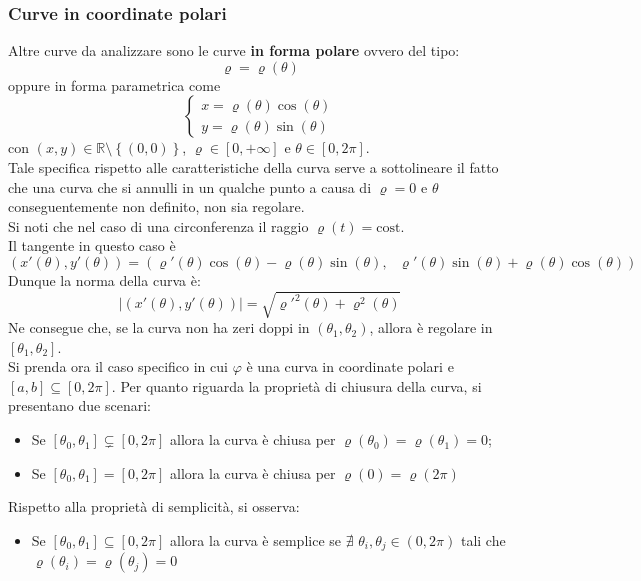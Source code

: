 \subsubsection{Curve in coordinate polari}
    Altre curve da analizzare sono le curve \textbf{in forma polare} ovvero del tipo:
    \begin{equation*}
        \varrho=\varrho(\theta) 
    \end{equation*}
    oppure in forma parametrica come 
    \begin{equation*}
        \begin{cases}
            x=\varrho(\theta)\cos(\theta)\\
            y=\varrho(\theta)\sin(\theta)
        \end{cases}
    \end{equation*}
    con $(x,y) \in \mathbb{R}\setminus \left\{(0,0)\right\}$, $\varrho \in \left[0, +\infty\right]$ e $\theta \in \left[0, 2\pi\right]$.\\
    Tale specifica rispetto alle caratteristiche della curva serve a sottolineare il fatto che una curva che si annulli in un qualche punto a causa di $\varrho=0$ e $\theta$ conseguentemente non definito, non sia regolare.\\
    Si noti che nel caso di una circonferenza il raggio $\varrho(t)=\text{cost}$.\\
    Il tangente in questo caso è
    \begin{equation*}
        (x'(\theta), y'(\theta))=(\varrho'(\theta)\cos(\theta)-\varrho(\theta)\sin(\theta), \text{ } \varrho'(\theta)\sin(\theta)+\varrho(\theta)\cos(\theta))
    \end{equation*}
    Dunque la norma della curva è:
    \begin{equation*}
        |(x'(\theta), y'(\theta))|=\sqrt{\varrho'^2(\theta)+\varrho^2(\theta)}
    \end{equation*} 
    Ne consegue che, se la curva non ha zeri doppi in $\left(\theta_1, \theta_2\right)$, allora è regolare in $\left[\theta_1, \theta_2\right]$.\\
    Si prenda ora il caso specifico in cui $\varphi$ è una curva in coordinate polari e $[a,b] \subseteq [0, 2\pi]$.
    Per quanto riguarda la proprietà di chiusura della curva, si presentano due scenari: 
    \begin{itemize}
        \item Se $[\theta_0, \theta_1] \subsetneq [0, 2\pi]$ allora la curva è chiusa per $\varrho(\theta_0)=\varrho(\theta_1)=0$;
        \item Se $[\theta_0, \theta_1]=[0, 2\pi]$ allora la curva è chiusa per $\varrho(0)=\varrho(2\pi)$
    \end{itemize}
    Rispetto alla proprietà di semplicità, si osserva:
    \begin{itemize}
        \item Se $[\theta_0, \theta_1] \subseteq [0, 2\pi]$ allora la curva è semplice se $\nexists$ $\theta_i, \theta_j \in (0,2\pi)$ tali che $\varrho(\theta_i)=\varrho(\theta_j)=0$
    \end{itemize}
